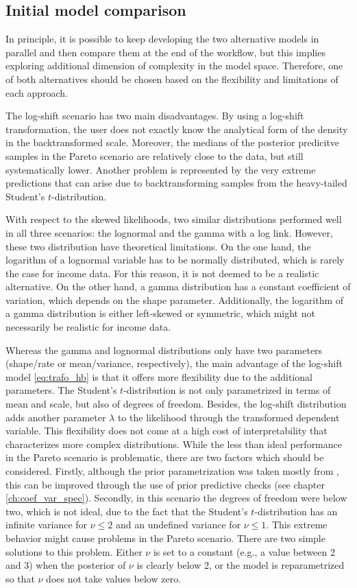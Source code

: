 \subsection{Initial model comparison}

In principle, it is possible to keep developing the two alternative models in parallel and then compare them at the end of the workflow, but this implies exploring additional dimension of complexity in the model space.
Therefore, one of both alternatives should be chosen based on the flexibility and limitations of each approach.

The log-shift scenario has two main disadvantages.
By using a log-shift transformation, the user does not exactly know the analytical form of the density in the backtransformed scale.
Moreover, the medians of the posterior predicitve samples in the Pareto scenario are relatively close to the data, but still systematically lower.
Another problem is represented by the very extreme predictions that can arise due to backtransforming samples from the heavy-tailed Student's $t$-distribution.

With respect to the skewed likelihoods, two similar distributions performed well in all three scenarios: the lognormal and the gamma with a log link.
However, these two distribution have theoretical limitations.
On the one hand, the logarithm of a lognormal variable has to be normally distributed, which is rarely the case for income data.
For this reason, it is not deemed to be a realistic alternative.
On the other hand, a gamma distribution has a constant coefficient of variation, which depends on the shape parameter.
Additionally, the logarithm of a gamma distribution is either left-skewed or symmetric, which might not necessarily be realistic for income data.

Whereas the gamma and lognormal distributions only have two parameters (shape/rate or mean/variance, respectively), the main advantage of the log-shift model \ref{eq:trafo_hb} is that it offers more flexibility due to the additional parameters.
The Student's $t$-distribution is not only parametrized in terms of mean and scale, but also of degrees of freedom.
Besides, the log-shift distribution adds another parameter $\lambda$ to the likelihood through the transformed dependent variable.
This flexibility does not come at a high cost of interpretability that characterizes more complex distributions.
While the less than ideal performance in the Pareto scenario is problematic, there are two factors which should be considered.
Firstly, although the prior parametrization was taken mostly from \cite{morelli_hierarchical_2021},
this can be improved through the use of prior predictive checks (see chapter \ref{ch:coef_var_spec}).
Secondly, in this scenario the degrees of freedom were below two, which is not ideal, due to the fact that the Student's $t$-distribution has an infinite variance for $\nu \le 2$ and an undefined variance for $\nu \le 1$.
This extreme behavior might cause problems in the Pareto scenario.
There are two simple solutions to this problem.
Either $\nu$ is set to a constant (e.g., a value between 2 and 3) when the posterior of $\nu$ is clearly below 2, or the model is reparametrized so that $\nu$ does not take values below zero.


